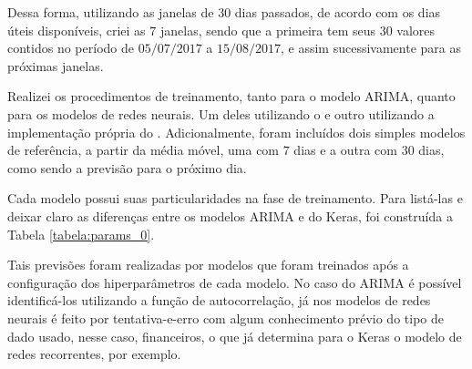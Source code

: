 Dessa forma, utilizando as janelas de $30$ dias passados, de acordo com os dias úteis disponíveis, criei as $7$ janelas, sendo que a primeira tem seus $30$ valores contidos no período de $05/07/2017$ a $15/08/2017$, e assim sucessivamente para as próximas janelas.

Realizei os procedimentos de treinamento, tanto para o modelo ARIMA, quanto para os modelos de redes neurais. Um deles utilizando o  e outro utilizando a implementação própria do . Adicionalmente, foram incluídos dois simples modelos de referência, a partir da média móvel, uma com $7$ dias e a outra com $30$ dias, como sendo a previsão para o próximo dia. 

Cada modelo possui suas particularidades na fase de treinamento. Para listá-las e deixar claro as diferenças entre os modelos ARIMA e do Keras, foi construída a Tabela \ref{tabela:params_0}.

\begin{table}[]
\begin{center}
\caption{Especificação dos dados de treino e de teste ($7$ dias).}\label{tabela:params_0}
\end{center}
\end{table}

Tais previsões foram realizadas por modelos que foram treinados após a configuração dos hiperparâmetros de cada modelo. No caso do ARIMA é possível identificá-los utilizando a função de autocorrelação, já nos modelos de redes neurais é feito por tentativa-e-erro com algum conhecimento prévio do tipo de dado usado, nesse caso, financeiros, o que já determina para o Keras o modelo de redes recorrentes, por exemplo. 

